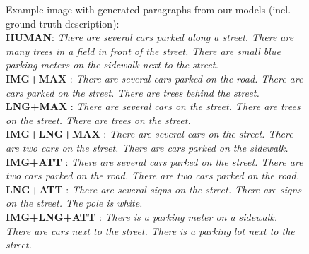 \documentclass[11pt,a4paper]{article}
\begin{document}
\begin{figure}[h]
\centering
 \caption{
 Example image with generated paragraphs from our models (incl. ground truth description):\\
 \textbf{HUMAN}: \textit{There are several cars parked along a street. There are many trees in a field in front of the street. There are small blue parking meters on the sidewalk next to the street.}\\
 \textbf{IMG+MAX} : \textit{There are several cars parked on the road. There are cars parked on the street. There are trees behind the street.}\\
 \textbf{LNG+MAX} : \textit{There are several cars on the street. There are trees on the street. There are trees on the street.}\\
 \textbf{IMG+LNG+MAX} : \textit{There are several cars on the street. There are two cars on the street. There are cars parked on the sidewalk.} \\
 \textbf{IMG+ATT} : \textit{There are several cars parked on the street. There are two cars parked on the road. There are two cars parked on the road.}\\
 \textbf{LNG+ATT} : \textit{There are several signs on the street. There are signs on the street. The pole is white.}\\
 \textbf{IMG+LNG+ATT} : \textit{There is a parking meter on a sidewalk. There are cars next to the street. There is a parking lot next to the street.} 
 }
 \label{example}
\end{figure}
\end{document}
